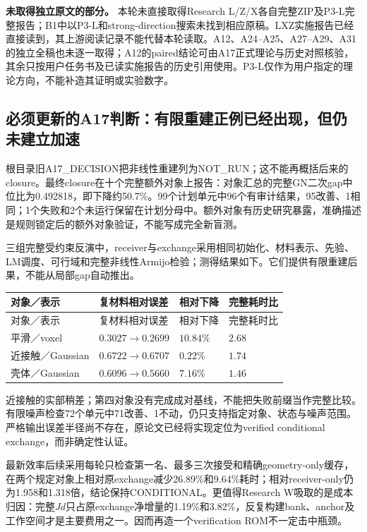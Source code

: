 \textbf{未取得独立原文的部分。}
本轮未直接取得Research L/Z/X各自完整ZIP及P3-L完整报告；B1中以P3-L和strong-direction搜索未找到相应原稿。LXZ实施报告已经直接读到，其上游阅读记录不能代替本轮读取。A12、A24--A25、A27--A29、A31的独立全稿也未逐一取得；A12的paired结论可由A17正式理论与历史对照核验，其余只按用户任务书及已读实施报告的历史引用使用。P3-L仅作为用户指定的理论方向，不能补造其证明或实验数字。

\subsection{必须更新的A17判断：有限重建正例已经出现，但仍未建立加速}

根目录旧A17\_DECISION把非线性重建列为NOT\_RUN；这不能再概括后来的closure。最终closure在十个完整额外对象上报告：对象汇总的完整GN二次gap中位比为0.492818，即下降约50.7\%。99个计划单元中96个有审计结果，95改善、1相同；1个失败和2个未运行保留在计划分母中。额外对象有历史研究暴露，准确描述是规则锁定后的额外对象验证，不能写成完全新盲测。\cite{R_A17}

三组完整受约束反演中，receiver与exchange采用相同初始化、材料表示、先验、LM调度、可行域和完整非线性Armijo检验；测得结果如下。它们提供有限重建后果，不能从局部gap自动推出。\cite{R_A17}

\begin{longtable}{p{3.1cm}p{3.9cm}p{2.5cm}p{3.1cm}}
\hline
对象／表示 & 复材料相对误差 & 相对下降 & 完整耗时比\\
\hline
\endfirsthead
\hline 对象／表示 & 复材料相对误差 & 相对下降 & 完整耗时比\\\hline
\endhead
平滑／voxel & \(0.3027\to0.2699\) & \(10.84\%\) & \(2.68\)\\
近接触／Gaussian & \(0.6722\to0.6707\) & \(0.22\%\) & \(1.74\)\\
壳体／Gaussian & \(0.6096\to0.5660\) & \(7.16\%\) & \(1.46\)\\
\hline
\end{longtable}

近接触的实部稍差；第四对象没有完成成对基线，不能把失败前缀当作完整比较。有限噪声检查72个单元中71改善、1不动，仍只支持指定对象、状态与噪声范围。严格输出误差半径尚不存在，原论文已经将实现定位为verified conditional exchange，而非确定性认证。

最新效率后续采用每轮只检查第一名、最多三次接受和精确geometry-only缓存，在两个规定对象上相对原exchange减少26.89\%和9.64\%耗时；相对receiver-only仍为1.958和1.318倍，结论保持CONDITIONAL。更值得Research W吸取的是成本归因：完整\(Jd\)只占原exchange净增量的1.19\%和3.82\%，反复构建bank、anchor及工作空间才是主要费用之一。因而再造一个verification ROM不一定击中瓶颈。\cite{R_A17eff}

